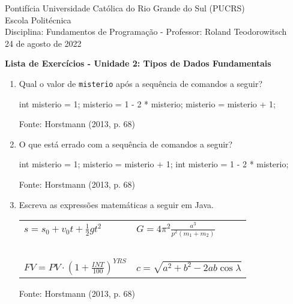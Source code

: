 \documentclass[onecolumn,a4paper,10pt]{report}
\newcommand{\+}{\, + \,}
\newcommand{\<}{\hspace*{-0.4cm}}
\begin{document}
\singlespacing

\begin{center}
Pontifícia Universidade Católica do Rio Grande do Sul (PUCRS)\\
Escola Politécnica\\
Disciplina: Fundamentos de Programação - Professor: Roland Teodorowitsch\\
24 de agosto de 2022
\end{center}

\begin{center}
\textbf{Lista de Exercícios - Unidade 2: Tipos de Dados Fundamentais}
\end{center}

\begin{enumerate}[1.]

\item Qual o valor de \texttt{misterio} após a sequência de comandos a seguir?\\
\begin{javacode}
int misterio = 1;
misterio = 1 - 2 * misterio;
misterio = misterio + 1;
\end{javacode}
{\tiny Fonte: Horstmann (2013, p. 68)}

\item O que está errado com a sequência de comandos a seguir?\\
\begin{javacode}
int misterio = 1;
misterio = misterio + 1;
int misterio = 1 - 2 * misterio;
\end{javacode}
{\tiny Fonte: Horstmann (2013, p. 68)}

\item Escreva as expressões matemáticas a seguir em Java.
\begin{center}
\begin{tabular}{p{5cm}p{5cm}}
$\displaystyle s = s_0 + v_0t+\frac{1}{2}gt^2 $ & $\displaystyle G = 4\pi^2\frac{a^3}{p^2(m_1+m_2)} $ \\
~ & ~\\
$\displaystyle \mathit{FV} = \mathit{PV} \cdot \left( 1 + \frac{\mathit{INT}}{100} \right)^{\mathit{YRS}} $ & $\displaystyle c = \sqrt{a^2+b^2-2ab\cos{\lambda}} $ \\
\end{tabular}
\end{center}
{\tiny Fonte: Horstmann (2013, p. 68)}


\end{enumerate}
\end{document}
